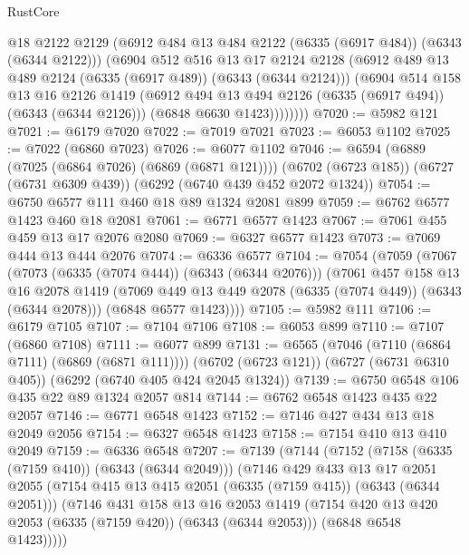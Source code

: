 \begin{lexlean}{RustCore}
\begin{coremodule}
              @18
              @2122
              @2129
              (@6912 @484 @13 @484 @2122 (@6335 (@6917 @484)) (@6343 (@6344 @2122)))
              (@6904
                @512
                @516
                @13
                @17
                @2124
                @2128
                (@6912 @489 @13 @489 @2124 (@6335 (@6917 @489)) (@6343 (@6344 @2124)))
                (@6904
                  @514
                  @158
                  @13
                  @16
                  @2126
                  @1419
                  (@6912 @494 @13 @494 @2126 (@6335 (@6917 @494)) (@6343 (@6344 @2126)))
                  (@6848 @6630 @1423))))))))
@7020 := @5982 @121
@7021 := @6179 @7020
@7022 := @7019 @7021
@7023 := @6053 @1102
@7025 := @7022 (@6860 @7023)
@7026 := @6077 @1102
@7046 := @6594
    (@6889 (@7025 (@6864 @7026) (@6869 (@6871 @121))))
    (@6702 (@6723 @185))
    (@6727 (@6731 @6309 @439))
    (@6292 (@6740 @439 @452 @2072 @1324))
@7054 := @6750 @6577 @111 @460 @18 @89 @1324 @2081 @899
@7059 := @6762 @6577 @1423 @460 @18 @2081
@7061 := @6771 @6577 @1423
@7067 := @7061 @455 @459 @13 @17 @2076 @2080
@7069 := @6327 @6577 @1423
@7073 := @7069 @444 @13 @444 @2076
@7074 := @6336 @6577
@7104 := @7054
    (@7059
      (@7067
        (@7073 (@6335 (@7074 @444)) (@6343 (@6344 @2076)))
        (@7061
          @457
          @158
          @13
          @16
          @2078
          @1419
          (@7069 @449 @13 @449 @2078 (@6335 (@7074 @449)) (@6343 (@6344 @2078)))
          (@6848 @6577 @1423))))
@7105 := @5982 @111
@7106 := @6179 @7105
@7107 := @7104 @7106
@7108 := @6053 @899
@7110 := @7107 (@6860 @7108)
@7111 := @6077 @899
@7131 := @6565
    (@7046 (@7110 (@6864 @7111) (@6869 (@6871 @111))))
    (@6702 (@6723 @121))
    (@6727 (@6731 @6310 @405))
    (@6292 (@6740 @405 @424 @2045 @1324))
@7139 := @6750 @6548 @106 @435 @22 @89 @1324 @2057 @814
@7144 := @6762 @6548 @1423 @435 @22 @2057
@7146 := @6771 @6548 @1423
@7152 := @7146 @427 @434 @13 @18 @2049 @2056
@7154 := @6327 @6548 @1423
@7158 := @7154 @410 @13 @410 @2049
@7159 := @6336 @6548
@7207 := @7139
    (@7144
      (@7152
        (@7158 (@6335 (@7159 @410)) (@6343 (@6344 @2049)))
        (@7146
          @429
          @433
          @13
          @17
          @2051
          @2055
          (@7154 @415 @13 @415 @2051 (@6335 (@7159 @415)) (@6343 (@6344 @2051)))
          (@7146
            @431
            @158
            @13
            @16
            @2053
            @1419
            (@7154 @420 @13 @420 @2053 (@6335 (@7159 @420)) (@6343 (@6344 @2053)))
            (@6848 @6548 @1423)))))

\end{coremodule}
\end{lexlean}
